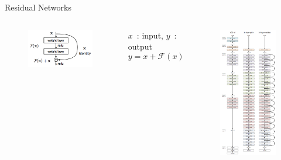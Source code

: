 \documentclass[handout]{beamer}
\begin{document}
\begin{frame}{Residual Networks}
    \begin{columns}
        \begin{figure}
        \centering
        \includegraphics[width=.9\textwidth]{fig/L2/res_block.png}

    \end{figure}
    $x$~: input, $y$~: output
    $$
    y = x + \mathcal{F}(x) 
    $$
    \pause
            \begin{figure}
        \centering
        \includegraphics[height=.9\textheight,trim={4cm 0cm 0cm 0cm},clip]{fig/L2/resnet_full.png}

    \end{figure}
    \end{columns}
\end{frame}
\end{document}
